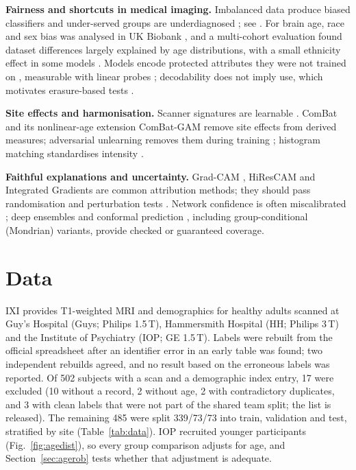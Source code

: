 \documentclass[conference]{IEEEtran}
\begin{document}
\textbf{Fairness and shortcuts in medical imaging.} Imbalanced data produce biased classifiers \cite{larrazabal2020gender} and under-served groups are underdiagnosed \cite{seyyed2021underdiagnosis}; see \cite{riccilara2022fairness}. For brain age, race and sex bias was analysed in UK Biobank \cite{picarra2023brainage}, and a multi-cohort evaluation found dataset differences largely explained by age distributions, with a small ethnicity effect in some models \cite{aguzin2026bias}. Models encode protected attributes they were not trained on \cite{glocker2023encoding}, measurable with linear probes \cite{alain2016probes}; decodability does not imply use, which motivates erasure-based tests \cite{belrose2023leace}.

\textbf{Site effects and harmonisation.} Scanner signatures are learnable \cite{glocker2019scanner}. ComBat \cite{johnson2007combat,fortin2018harmonization} and its nonlinear-age extension ComBat-GAM \cite{pomponio2020combatgam} remove site effects from derived measures; adversarial unlearning removes them during training \cite{ganin2016dann,dinsdale2021unlearning}; histogram matching standardises intensity \cite{nyul2000standardization}.

\textbf{Faithful explanations and uncertainty.} Grad-CAM \cite{selvaraju2017gradcam}, HiResCAM \cite{draelos2020hirescam} and Integrated Gradients \cite{sundararajan2017ig} are common attribution methods; they should pass randomisation \cite{adebayo2018sanity} and perturbation tests \cite{samek2017evaluating,hooker2019benchmark}. Network confidence is often miscalibrated \cite{guo2017calibration}; deep ensembles \cite{lakshminarayanan2017ensembles} and conformal prediction \cite{vovk2005algorithmic,angelopoulos2023conformal}, including group-conditional (Mondrian) variants, provide checked or guaranteed coverage.

\section{Data}
IXI \cite{ixi} provides T1-weighted MRI and demographics for healthy adults scanned at Guy's Hospital (Guys; Philips 1.5\,T), Hammersmith Hospital (HH; Philips 3\,T) and the Institute of Psychiatry (IOP; GE 1.5\,T). Labels were rebuilt from the official spreadsheet after an identifier error in an early table was found; two independent rebuilds agreed, and no result based on the erroneous labels was reported. Of 502 subjects with a scan and a demographic index entry, 17 were excluded (10 without a record, 2 without age, 2 with contradictory duplicates, and 3 with clean labels that were not part of the shared team split; the list is released). The remaining 485 were split 339/73/73 into train, validation and test, stratified by site (Table~\ref{tab:data}). IOP recruited younger participants (Fig.~\ref{fig:agedist}), so every group comparison adjusts for age, and Section~\ref{sec:agerob} tests whether that adjustment is adequate.
\end{document}

